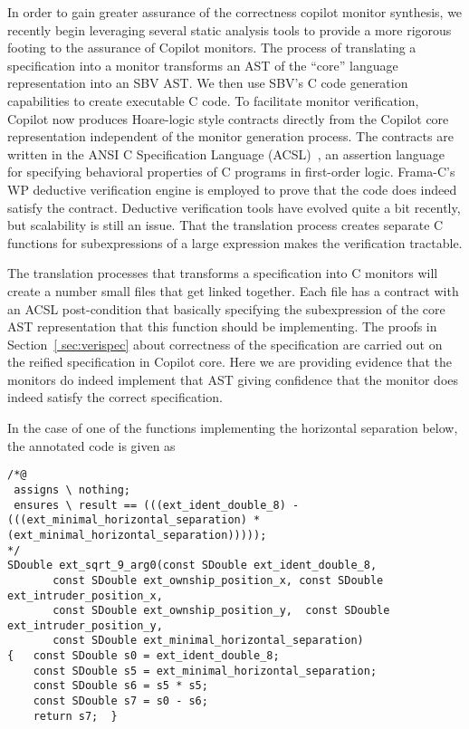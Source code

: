 In order to gain greater assurance of the correctness copilot monitor
synthesis, we recently begin leveraging several static analysis tools
to provide a more rigorous footing to the assurance of Copilot
monitors.   The process of translating a specification into a monitor
transforms an AST of the ``core'' language representation into an SBV
AST.  We then use SBV's C code generation capabilities to create
executable C code.  To facilitate monitor verification, Copilot now
produces Hoare-logic style contracts directly from the Copilot core
representation independent of the monitor generation process. The
contracts are written in the ANSI C Specification Language
(ACSL)~\cite{baudin09acsl}, an assertion language for specifying
behavioral properties of C programs in first-order logic.
Frama-C's~\cite{framac} WP deductive verification engine is employed
to prove that the code does indeed satisfy the contract. Deductive
verification tools have evolved quite a bit recently, but scalability
is still an issue.  That the translation process creates separate C
functions for subexpressions of a large expression makes the
verification tractable. 

The translation processes that transforms  a specification  into C monitors will create a number small files
that get linked together. Each file has a contract  with an ACSL 
post-condition that basically specifying the subexpression of the core
AST representation that this function should be  implementing. 
The proofs in Section~\ref{ sec:verispec}  about correctness of the
specification are carried out on the reified specification in Copilot
core. Here we are providing evidence that the monitors do indeed
implement that AST giving confidence that the monitor does indeed
satisfy the correct specification. 

In the case of one of the functions implementing
the horizontal separation below, the annotated code is given as 

\begin{Verbatim}[fontsize=\tiny]
/*@
 assigns \ nothing;
 ensures \ result == (((ext_ident_double_8) - (((ext_minimal_horizontal_separation) * (ext_minimal_horizontal_separation)))));
*/
SDouble ext_sqrt_9_arg0(const SDouble ext_ident_double_8,
       const SDouble ext_ownship_position_x, const SDouble ext_intruder_position_x,
       const SDouble ext_ownship_position_y,  const SDouble ext_intruder_position_y,
       const SDouble ext_minimal_horizontal_separation)
{   const SDouble s0 = ext_ident_double_8;
    const SDouble s5 = ext_minimal_horizontal_separation;
    const SDouble s6 = s5 * s5;
    const SDouble s7 = s0 - s6;
    return s7;  }
\end{Verbatim}


